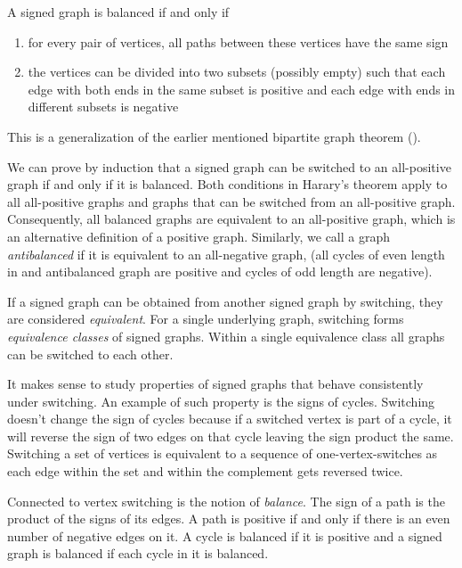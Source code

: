 \begin{theorem}[Harary]\label{th:harary}
    A signed graph is balanced if and only if
    \begin{enumerate}
        \item for every pair of vertices, all paths between these vertices have the same sign
        \item the vertices can be divided into two subsets (possibly empty) such that each edge with both ends in the same subset is positive and each edge with ends in different subsets is negative
    \end{enumerate}

    This is a generalization of the earlier mentioned bipartite graph theorem ().
\end{theorem}

We can prove by induction that a signed graph can be switched to an all-positive graph if and only if it is balanced. Both conditions in Harary's theorem apply to all all-positive graphs and graphs that can be switched from an all-positive graph. Consequently, all balanced graphs are equivalent to an all-positive graph, which is an alternative definition of a positive graph. Similarly, we call a graph \textit{antibalanced} if it is equivalent to an all-negative graph, (all cycles of even length in and antibalanced graph are positive and cycles of odd length are negative).

If a signed graph can be obtained from another signed graph by switching, they are considered \textit{equivalent}. For a single underlying graph, switching forms \textit{equivalence classes} of signed graphs. Within a single equivalence class all graphs can be switched to each other.

It makes sense to study properties of signed graphs that behave consistently under switching. An example of such property is the signs of cycles. Switching doesn't change the sign of cycles because if a switched vertex is part of a cycle, it will reverse the sign of two edges on that cycle leaving the sign product the same. Switching a set of vertices is equivalent to a sequence of one-vertex-switches as each edge within the set and within the complement gets reversed twice.

Connected to vertex switching is the notion of \textit{balance}. The sign of a path is the product of the signs of its edges. A path is positive if and only if there is an even number of negative edges on it. A cycle is balanced if it is positive and a signed graph is balanced if each cycle in it is balanced\cite{harary}.


